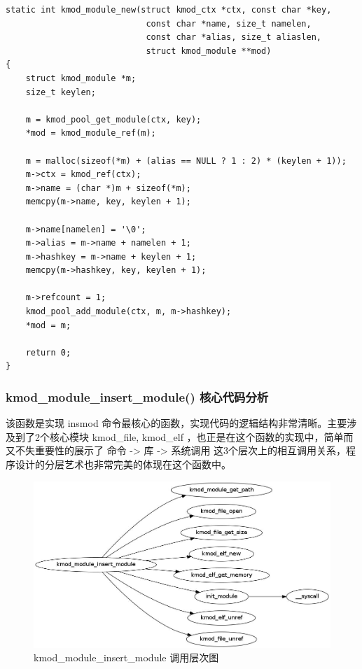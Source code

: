 \documentclass[11pt,a4paper]{article}
\makeatletter
\def\maxwidth{\ifdim\Gin@nat@width>\linewidth\linewidth
\else\Gin@nat@width\fi}
\let\Oldincludegraphics\includegraphics
\renewcommand{\includegraphics}[1]{\Oldincludegraphics[width=\maxwidth]{#1}}
\makeatother
\begin{document}
{\begin{shaded}\begin{verbatim}
static int kmod_module_new(struct kmod_ctx *ctx, const char *key,
                            const char *name, size_t namelen,
                            const char *alias, size_t aliaslen,
                            struct kmod_module **mod)
{
    struct kmod_module *m;
    size_t keylen;

    m = kmod_pool_get_module(ctx, key);
    *mod = kmod_module_ref(m);

    m = malloc(sizeof(*m) + (alias == NULL ? 1 : 2) * (keylen + 1));
    m->ctx = kmod_ref(ctx);
    m->name = (char *)m + sizeof(*m);
    memcpy(m->name, key, keylen + 1);

    m->name[namelen] = '\0';
    m->alias = m->name + namelen + 1;
    m->hashkey = m->name + keylen + 1;
    memcpy(m->hashkey, key, keylen + 1);

    m->refcount = 1;
    kmod_pool_add_module(ctx, m, m->hashkey);
    *mod = m;

    return 0;
}
\end{verbatim}\end{shaded}}
\subsubsection{kmod\_module\_insert\_module() 核心代码分析}

该函数是实现 insmod
命令最核心的函数，实现代码的逻辑结构非常清晰。主要涉及到了2个核心模块
kmod\_file, kmod\_elf
，也正是在这个函数的实现中，简单而又不失重要性的展示了 命令
-\textgreater{} 库 -\textgreater{} 系统调用
这3个层次上的相互调用关系，程序设计的分层艺术也非常完美的体现在这个函数中。

\begin{figure}[htbp]
\centering
\includegraphics{./figures/kmod_module_insert_module.jpg}
\caption{kmod\_module\_insert\_module 调用层次图}
\end{figure}
\end{document}
